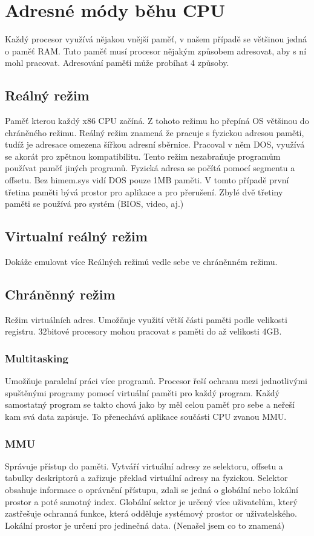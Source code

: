 \section{Adresné módy běhu CPU}
\label{sec:adresnemody}
Každý procesor využívá nějakou vnější paměť, v našem případě se většinou jedná o paměť RAM.
Tuto paměť musí procesor nějakým způsobem adresovat, aby s ní mohl pracovat.
Adresování paměťi může probíhat 4 způsoby.
\subsection{Reálný režim}
Paměť kterou každý x86 CPU začíná.
Z tohoto režimu ho přepíná OS většinou do chráněného režimu.
Reálný režim znamená že pracuje s fyzickou adresou paměti, tudíž je adresace omezena šířkou adresní sběrnice.
Pracoval v něm DOS, využívá se akorát pro zpětnou kompatibilitu.
Tento režim nezabraňuje programům používat paměť jiných programů.
Fyzická adresa se počítá pomocí segmentu a offsetu.
Bez himem.sys vidí DOS pouze 1MB paměti.
V tomto případě první třetina paměti bývá prostor pro aplikace a pro přerušení.
Zbylé dvě třetiny paměti se používá pro systém (BIOS, video, aj.)

\subsection{Virtualní reálný režim}
Dokáže emulovat více Reálných režimů vedle sebe ve chráněnném režimu.

\subsection{Chráněnný režim}
Režim virtuálních adres.
Umožňuje využití větší části paměti podle velikosti registru.
32bitové procesory mohou pracovat s paměti do až velikosti 4GB.

\subsubsection{Multitasking}
Umožňuje paralelní práci více programů.
Procesor řeší ochranu mezi jednotlivými spuštěnými programy pomocí virtuální paměti pro každý program.
Každý samostatný program se takto chová jako by měl celou paměť pro sebe a neřeší kam svá data zapisuje.
To přenechává aplikace součásti CPU zvanou MMU.

\subsubsection{MMU}
Správuje přístup do paměti.
Vytváří virtuální adresy ze selektoru, offsetu a tabulky deskriptorů a zařizuje překlad virtuální adresy na fyzickou.
Selektor obsahuje informace o oprávnění přístupu, zdali se jedná o globální nebo lokální prostor a poté samotný index.
Globální sektor je určený více uživatelům, který zastřešuje ochranná funkce, která odděluje systémový prostor or uživatelského.
Lokální prostor je určení pro jedinečná data. (Nenašel jsem co to znamená)

